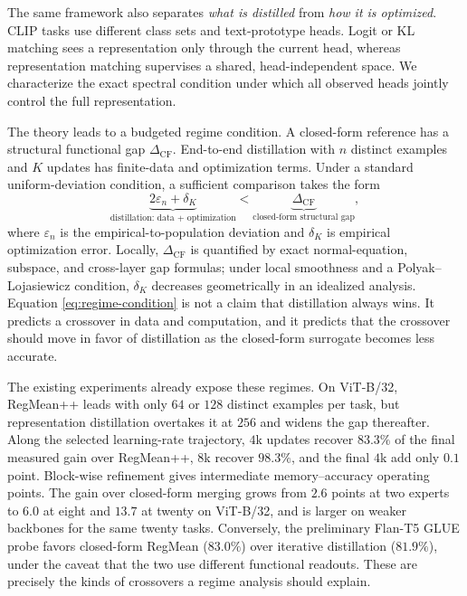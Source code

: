 \documentclass[letterpaper]{article} %
\theoremstyle{plain}
\theoremstyle{definition}
\begin{document}
The same framework also separates \emph{what is distilled} from \emph{how it is optimized}.
CLIP tasks use different class sets and text-prototype heads.
Logit or KL matching sees a representation only through the current head, whereas representation matching supervises a shared, head-independent space.
We characterize the exact spectral condition under which all observed heads jointly control the full representation.

The theory leads to a budgeted regime condition.
A closed-form reference has a structural functional gap $\Delta_{\mathrm{CF}}$.
End-to-end distillation with $n$ distinct examples and $K$ updates has finite-data and optimization terms.
Under a standard uniform-deviation condition, a sufficient comparison takes the form
\begin{equation}
\underbrace{2\varepsilon_n+\delta_K}_{\text{distillation: data + optimization}}
<
\underbrace{\Delta_{\mathrm{CF}}}_{\text{closed-form structural gap}},
\label{eq:regime-condition}
\end{equation}
where $\varepsilon_n$ is the empirical-to-population deviation and $\delta_K$ is empirical optimization error.
Locally, $\Delta_{\mathrm{CF}}$ is quantified by exact normal-equation, subspace, and cross-layer gap formulas; under local smoothness and a Polyak--Lojasiewicz condition, $\delta_K$ decreases geometrically in an idealized analysis.
Equation \eqref{eq:regime-condition} is not a claim that distillation always wins.
It predicts a crossover in data and computation, and it predicts that the crossover should move in favor of distillation as the closed-form surrogate becomes less accurate.

The existing experiments already expose these regimes.
On ViT-B/32, RegMean++ leads with only $64$ or $128$ distinct examples per task, but representation distillation overtakes it at $256$ and widens the gap thereafter.
Along the selected learning-rate trajectory, $4$k updates recover $83.3\%$ of the final measured gain over RegMean++, $8$k recover $98.3\%$, and the final $4$k add only $0.1$ point.
Block-wise refinement gives intermediate memory--accuracy operating points.
The gain over closed-form merging grows from $2.6$ points at two experts to $6.0$ at eight and $13.7$ at twenty on ViT-B/32, and is larger on weaker backbones for the same twenty tasks.
Conversely, the preliminary Flan-T5 GLUE probe favors closed-form RegMean ($83.0\%$) over iterative distillation ($81.9\%$), under the caveat that the two use different functional readouts.
These are precisely the kinds of crossovers a regime analysis should explain.
\end{document}
